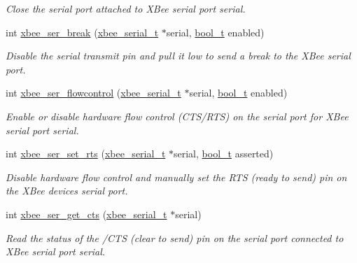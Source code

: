 \begin{DoxyCompactItemize}
\begin{DoxyCompactList}\small\item\em Close the serial port attached to X\+Bee serial port {\itshape serial}. \end{DoxyCompactList}\item 
int \hyperlink{group__hal__hcs08_gae19aa61eec588d1b935d267b0a982319}{xbee\+\_\+ser\+\_\+break} (\hyperlink{structxbee__serial__t}{xbee\+\_\+serial\+\_\+t} $\ast$serial, \hyperlink{group__hal__dos_ga04dd5074964518403bf944f2b240a5f8}{bool\+\_\+t} enabled)
\begin{DoxyCompactList}\small\item\em Disable the serial transmit pin and pull it low to send a break to the X\+Bee serial port. \end{DoxyCompactList}\item 
int \hyperlink{group__hal__hcs08_ga33229d0d63ff1442f23b0739794d3afb}{xbee\+\_\+ser\+\_\+flowcontrol} (\hyperlink{structxbee__serial__t}{xbee\+\_\+serial\+\_\+t} $\ast$serial, \hyperlink{group__hal__dos_ga04dd5074964518403bf944f2b240a5f8}{bool\+\_\+t} enabled)
\begin{DoxyCompactList}\small\item\em Enable or disable hardware flow control (C\+T\+S/\+R\+TS) on the serial port for X\+Bee serial port {\itshape serial}. \end{DoxyCompactList}\item 
int \hyperlink{group__hal__hcs08_gad1b1f9f42e58d8299ddcca1c9cb3c5e8}{xbee\+\_\+ser\+\_\+set\+\_\+rts} (\hyperlink{structxbee__serial__t}{xbee\+\_\+serial\+\_\+t} $\ast$serial, \hyperlink{group__hal__dos_ga04dd5074964518403bf944f2b240a5f8}{bool\+\_\+t} asserted)
\begin{DoxyCompactList}\small\item\em Disable hardware flow control and manually set the R\+TS (ready to send) pin on the X\+Bee device\textquotesingle{}s serial port. \end{DoxyCompactList}\item 
int \hyperlink{group__hal__hcs08_ga894f6fadc890b5ba5ce32338f0acd217}{xbee\+\_\+ser\+\_\+get\+\_\+cts} (\hyperlink{structxbee__serial__t}{xbee\+\_\+serial\+\_\+t} $\ast$serial)
\begin{DoxyCompactList}\small\item\em Read the status of the /\+C\+TS (clear to send) pin on the serial port connected to X\+Bee serial port {\itshape serial}. \end{DoxyCompactList}\item 

\end{DoxyCompactItemize}
